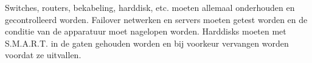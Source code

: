 Switches, routers, bekabeling, harddisk, etc. moeten allemaal onderhouden en gecontrolleerd worden. Failover netwerken en servers moeten getest worden en de conditie van de apparatuur moet nagelopen worden. Harddisks moeten met S.M.A.R.T. in de gaten gehouden worden en bij voorkeur vervangen worden voordat ze uitvallen.
